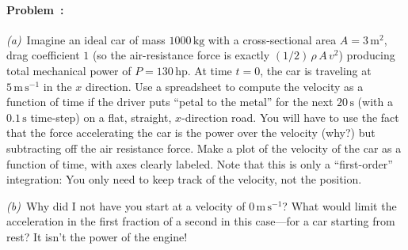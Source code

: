 \documentclass[12pt]{article}
\newcounter{problem}
\newcommand{\kg}{\mathrm{kg}}
\newcommand{\m}{\mathrm{m}}
\newcommand{\s}{\mathrm{s}}
\newcommand{\mps}{\m\,\s^{-1}}
\newcommand{\hp}{\mathrm{hp}}
\begin{document}
\paragraph{Problem~\theproblem:}%
\textsl{(a)}~Imagine an ideal car of mass $1000\,\kg$ with a
cross-sectional area $A=3\,\m^2$, drag coefficient $1$ (so the
air-resistance force is exactly $(1/2)\,\rho\,A\,v^2$) producing total
mechanical power of $P=130\,\hp$.  At time $t=0$, the car is traveling
at $5\,\mps$ in the $x$ direction.  Use a spreadsheet to compute the
velocity as a function of time if the driver puts ``petal to the
metal'' for the next $20\,\s$ (with a $0.1\,\s$ time-step) on a flat,
straight, $x$-direction road.  You will have to use the fact that the
force accelerating the car is the power over the velocity (why?) but
subtracting off the air resistance force.  Make a plot of the velocity
of the car as a function of time, with axes clearly labeled.  Note
that this is only a ``first-order'' integration: You only need to keep
track of the velocity, not the position.

\textsl{(b)}~Why did I not have you start at a velocity of $0\,\mps$?
What would limit the acceleration in the first fraction of a second in
this case---for a car starting from rest?  It isn't the power of the
engine!
\end{document}
